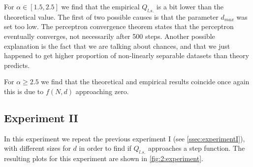 For $\alpha \in [1.5, 2.5]$ we find that the empirical $Q_{l.s.}$ is a bit lower than the theoretical value. The first of two possible causes is that the parameter $d_{max}$ was set too low. The perceptron convergence theorem states that the perceptron eventually converges, not necessarily after 500 steps. Another possible explanation is the fact that we are talking about chances, and that we just happened to get higher proportion of non-linearly separable datasets than theory predicts. 

For $\alpha \geq 2.5$ we find that the theoretical and empirical results coincide once again this is due to $f(N,d)$ approaching zero.

\subsection*{Experiment II}

In this experiment we repeat the previous experiment I (see \vref{ssec:experimentI}), with different sizes for $d$ in order to find if $Q_{l.s.}$ approaches a step function. The resulting plots for this experiment are shown in \vref{fig:2:experiment}. 

